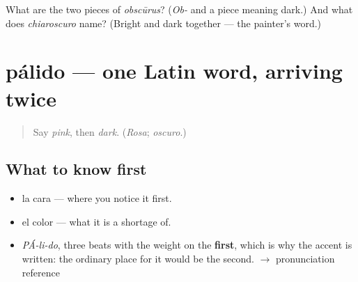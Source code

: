 \begin{tcolorbox}[breakable,colback=teal!4,colframe=teal!35!black,title={Before you move on}]
What are the two pieces of \emph{obscūrus}? (\emph{Ob-} and a piece meaning dark.) And what does \emph{chiaroscuro} name? (Bright and dark together — the painter's word.)
\end{tcolorbox}
\section[pálido]{pálido — one Latin word, arriving twice}

\label{lesson:ES-C372-palido}



\begin{quote}
Say \emph{pink}, then \emph{dark}. (\emph{Rosa}; \emph{oscuro}.)
\end{quote}

\subsection*{What to know first}
\begin{itemize}
\raggedright
  \item la cara — where you notice it first.
  \item el color — what it is a shortage of.
\end{itemize}

\begin{sounds}
\begin{itemize}
\raggedright
  \item \emph{PÁ-li-do}, three beats with the weight on the \textbf{first}, which is why the accent is written: the ordinary place for it would be the second. $\to$ pronunciation reference
\end{itemize}
\end{sounds}

